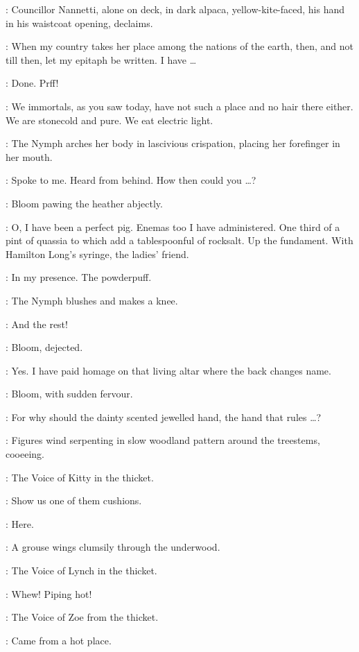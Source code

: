 :
Councillor Nannetti, alone on deck, in dark alpaca, yellow-kite-faced,
his hand in his waistcoat opening, declaims.

\CouncillorNannetti:
When my country takes her place among the nations of the earth,
then, and not till then, let my epitaph be written.
I have \ldots

\Bloom:
Done.
Prff!

\Nymph:
We immortals, as you saw today,
have not such a place and no hair there either.
We are stonecold and pure.
We eat electric light.

:
The Nymph arches her body in lascivious crispation,
placing her forefinger in her mouth.

\Nymph:
Spoke to me.
Heard from behind.
How then could you \ldots?

:
Bloom pawing the heather abjectly.

\Bloom:
O, I have been a perfect pig.
Enemas too I have administered.
One third of a pint of quassia to which add a tablespoonful of rocksalt.
Up the fundament.
With Hamilton Long's syringe, the ladies' friend.%

\Nymph:
In my presence.
The powderpuff.

:
The Nymph blushes and makes a knee.

\Nymph:
And the rest!

:
Bloom, dejected.

\Bloom:
Yes.
I have paid homage on that living altar where the back changes name.

:
Bloom, with sudden fervour.

\Bloom:
For why should the dainty scented jewelled hand, the hand that rules \ldots?

:
Figures wind serpenting in slow woodland pattern
around the treestems, coo\-ee\-ing.

:
The Voice of Kitty in the thicket.

\VoiceKitty:
Show us one of them cushions.

\VoiceFlorry[1]:
Here.

:
A grouse wings clumsily through the underwood.

:
The Voice of Lynch in the thicket.

\VoiceLynch:
Whew!
Piping hot!

:
The Voice of Zoe from the thicket.

\VoiceZoe:
Came from a hot place.

